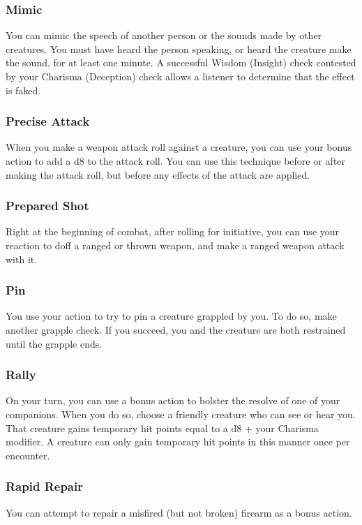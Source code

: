 \subsubsection{Mimic} \label{tec::mimic}
You can mimic the speech of another person or the sounds made by other creatures.
You must have heard the person speaking, or heard the creature make the sound, for at least one minute.
A successful Wisdom (Insight) check contested by your Charisma (Deception) check allows a listener to determine that the effect is faked.

\subsubsection{Precise Attack} \label{tec::preciseattack}
When you make a weapon attack roll against a creature, you can use your bonus action to add a d8 to the attack roll.
You can use this technique before or after making the attack roll, but before any effects of the attack are applied.

\subsubsection{Prepared Shot} \label{tec::preparedshot}
Right at the beginning of combat, after rolling for initiative, you can use your reaction to doff a ranged or thrown weapon, and make a ranged weapon attack with it.

\subsubsection{Pin} \label{tec::pin}
You use your action to try to pin a creature grappled by you.
To do so, make another grapple check.
If you succeed, you and the creature are both restrained until the grapple ends.

\subsubsection{Rally} \label{tec::rally}
On your turn, you can use a bonus action to bolster the resolve of one of your companions.
When you do so, choose a friendly creature who can see or hear you.
That creature gains temporary hit points equal to a d8 + your Charisma modifier.
A creature can only gain temporary hit points in this manner once per encounter.

\subsubsection{Rapid Repair} \label{tec::rapidrepair}
You can attempt to repair a misfired (but not broken) firearm as a bonus action.

